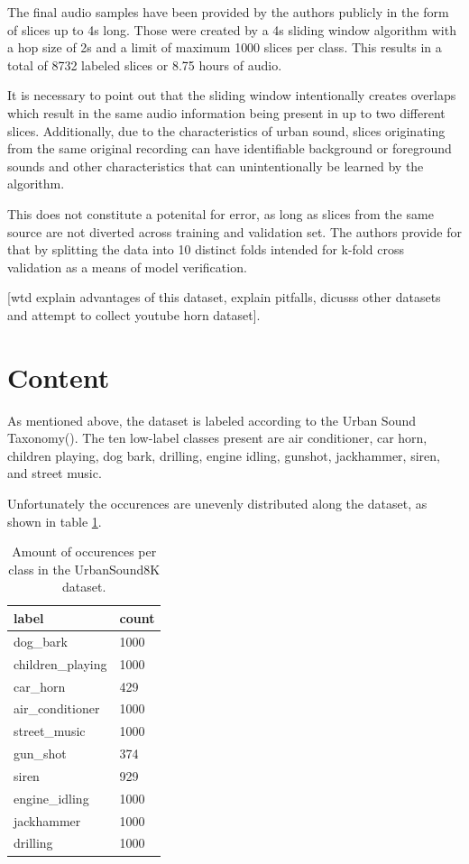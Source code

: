 The final audio samples have been provided by the authors publicly in the form of slices up to 4s long. Those were created by a 4s sliding window algorithm with a hop size of 2s and a limit of maximum 1000 slices per class. This results in a total of 8732 labeled slices or 8.75 hours of audio.

It is necessary to point out that the sliding window intentionally creates overlaps which result in the same audio information being present in up to two different slices. Additionally, due to the characteristics of urban sound, slices originating from the same original recording can have identifiable background or foreground sounds and other characteristics that can unintentionally be learned by the algorithm. %

 This does not constitute a potenital for error, as long as 
  slices from the same source are not diverted across training and validation set. The authors provide for that by splitting the data into 10 distinct folds intended for k-fold cross validation as a means of model verification.

[wtd explain advantages of this dataset, explain pitfalls, dicusss other datasets and attempt to collect youtube horn dataset].

\section{Content}

As mentioned above, the dataset is labeled according to the Urban Sound Taxonomy(\cite{Salamon:UrbanSound:ACMMM:14}). The ten low-label classes present are air conditioner, car horn, children playing, dog bark, drilling, engine idling, gunshot, jackhammer, siren, and street music.

Unfortunately the occurences are unevenly distributed along the dataset, as shown in table \ref{tbl:urbansound8kdistribution}. 

\begin{table}[h]
\centering
\begin{tabular}{ll}
\hline
label & count \\
\hline
dog_bark & 1000 \\
children_playing & 1000 \\
car_horn & 429 \\
air_conditioner & 1000 \\
street_music & 1000 \\
gun_shot & 374 \\
siren & 929 \\
engine_idling & 1000 \\
jackhammer & 1000 \\
drilling & 1000
\end{tabular}
\caption{Amount of occurences per class in the UrbanSound8K dataset.}
\label{tbl:urbansound8kdistribution}
\par
\end{table}

